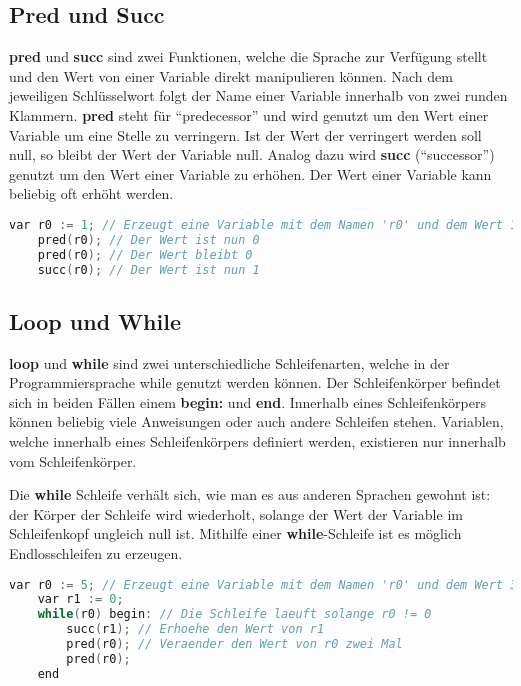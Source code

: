 \subsection{Pred und Succ} \label{subsec:while-konzepte-pred}
\textbf{pred} und \textbf{succ} sind zwei Funktionen, welche die Sprache zur Verfügung stellt und den Wert von einer Variable direkt manipulieren können. Nach dem jeweiligen Schlüsselwort folgt der Name einer Variable innerhalb von zwei runden Klammern. \textbf{pred} steht für \enquote{predecessor} und wird genutzt um den Wert einer Variable um eine Stelle zu verringern. Ist der Wert der verringert werden soll null, so bleibt der Wert der Variable null. Analog dazu wird \textbf{succ} (\enquote{successor}) genutzt um den Wert einer Variable zu erhöhen. Der Wert einer Variable kann beliebig oft erhöht werden.

\begin{lstlisting}[language=c, caption=pred und succ in While, label={lst:while-pred-succ}]
	var r0 := 1; // Erzeugt eine Variable mit dem Namen 'r0' und dem Wert 1
	pred(r0); // Der Wert ist nun 0
	pred(r0); // Der Wert bleibt 0
	succ(r0); // Der Wert ist nun 1
\end{lstlisting}

\subsection{Loop und While}
\textbf{loop} und \textbf{while} sind zwei unterschiedliche Schleifenarten, welche in der Programmiersprache while genutzt werden können. Der Schleifenkörper befindet sich in beiden Fällen einem \textbf{begin:} und \textbf{end}. Innerhalb eines Schleifenkörpers können beliebig viele Anweisungen oder auch andere Schleifen stehen. Variablen, welche innerhalb eines Schleifenkörpers definiert werden, existieren nur innerhalb vom Schleifenkörper.

Die \textbf{while} Schleife verhält sich, wie man es aus anderen Sprachen gewohnt ist: der Körper der Schleife wird wiederholt, solange der Wert der Variable im Schleifenkopf ungleich null ist. Mithilfe einer \textbf{while}-Schleife ist es möglich Endlosschleifen zu erzeugen.

\begin{lstlisting}[language=c, caption=while-Schleife in While, label={lst:while-while}]
	var r0 := 5; // Erzeugt eine Variable mit dem Namen 'r0' und dem Wert 3
	var r1 := 0;
	while(r0) begin: // Die Schleife laeuft solange r0 != 0
		succ(r1); // Erhoehe den Wert von r1
		pred(r0); // Veraender den Wert von r0 zwei Mal
		pred(r0);
	end
\end{lstlisting}

